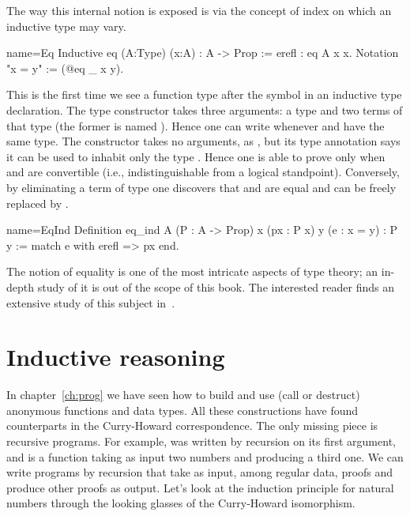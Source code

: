 The way this internal notion is exposed is via the concept of index
on which an inductive type may vary.

\begin{coq}{name=Eq}{}
Inductive eq (A:Type) (x:A) : A -> Prop := erefl : eq A x x.
Notation "x = y" := (@eq _ x y).
\end{coq}

This is the first time we see a function type after the \C{:} symbol
in an inductive type declaration.
The  type constructor takes three arguments: a type  and
two terms of that type (the former is named ).
Hence one can write  whenever  and 
have the same type.
The  constructor takes no arguments, as , but its type
annotation says it can be used to inhabit only the type .
Hence one is able to prove  only when  and  are
convertible
(i.e., indistinguishable from a logical standpoint).
Conversely, by eliminating a term
of type  one discovers that   and  are
equal and  can be freely replaced by .

\begin{coq}{name=EqInd}{}
Definition eq_ind A (P : A -> Prop) x (px : P x) y (e : x = y) : P y :=
  match e with erefl => px end.
\end{coq}

The notion of equality is one of the most intricate aspects of type
theory; an in-depth study of it is out of the scope of this book.  The interested reader
finds an extensive study of this subject in~\cite{hottbook}.  %


\section{Inductive reasoning}\label{ssec:indreason}

In chapter~\ref{ch:prog} we have seen how to build and use (call or destruct)
anonymous functions and data types.  All these
constructions have found counterparts in the Curry-Howard correspondence.
The only missing piece is recursive programs.  For example,
 was written by recursion on its first argument, and is a
function taking as input two numbers and producing a third one.
We can write programs by recursion that take as input, among regular  data,
proofs and produce  other proofs as output.  Let's look at the
induction principle for natural numbers through the looking glasses of the
Curry-Howard isomorphism.

